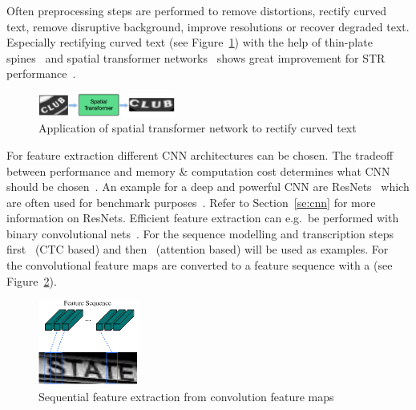 Often preprocessing steps are performed to remove distortions, rectify curved text,
remove disruptive background, improve resolutions or recover degraded text.
Especially rectifying curved text (see Figure~\ref{fig:STN-application}) with the help of
thin-plate spines~\citep{bookstein_principal_1989} and spatial transformer
networks~\citep{jaderberg_spatial_2015} shows great improvement for \ac{STR}
performance~\citep{long_scene_2021,chen_text_2021}.
\begin{figure}[h]
    \centering
    \includegraphics[width=0.4\textwidth]{img/STN-result-Liu-STAR-2016.png}
    \caption[Text rectification application]{%
        Application of spatial transformer network to rectify curved
        text~\citep{liu_star-net_2016}\label{fig:STN-application}
    }
\end{figure}
For feature extraction different \ac{CNN} architectures can be chosen.
The tradeoff between performance and memory \& computation cost determines what \ac{CNN} should be
chosen~\citep{chen_text_2021}.
An example for a deep and powerful \ac{CNN} are ResNets~\citep{he_deep_2015} which are often used
for benchmark purposes~\citep{chen_text_2021,long_scene_2021}.
Refer to Section~\ref{se:cnn} for more information on ResNets.
Efficient feature extraction can e.g.\ be performed with binary convolutional
nets~\citep{liu_scut-ctw1500_2022}.
For the sequence modelling and transcription steps first~\cite{shi_end--end_2017} (\ac{CTC} based)
and then~\cite{ghosh_visual_2017} (attention based) will be used as examples.
For~\cite{shi_end--end_2017} the convolutional feature maps are converted to a feature sequence
with a (see Figure~\ref{fig:STR-CTC-seq-feat}).
\begin{figure}[h]
    \centering
    \includegraphics[width=0.3\textwidth]{img/STR-encdec-sequence-feat.png}
    \caption[Sequential feature extraction from convolution feature maps]{%
        Sequential feature extraction from convolution feature
        maps~\citep{shi_end--end_2017}\label{fig:STR-CTC-seq-feat}
    }
\end{figure}
